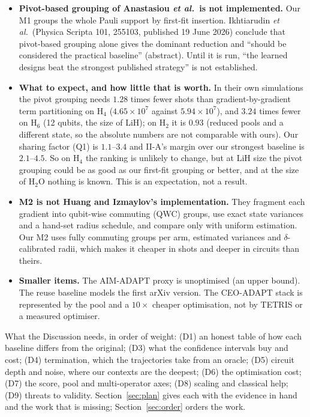 \documentclass[11pt]{article}
\newcommand{\Hfour}{H$_4$}
\newcommand{\Htwo}{H$_2$O}
\begin{document}
\begin{itemize}[leftmargin=1.6em,itemsep=2pt]
\item \textbf{Pivot-based grouping of Anastasiou \emph{et al.}\ is not implemented.} Our M1 groups the whole Pauli support by first-fit insertion. Ikhtiarudin \emph{et al.}\ (Physica Scripta 101, 255103, published 19 June 2026) conclude that pivot-based grouping alone gives the dominant reduction and ``should be considered the practical baseline'' (abstract). Until it is run, ``the learned designs beat the strongest published strategy'' is not established.
\item \textbf{What to expect, and how little that is worth.} In their own simulations the pivot grouping needs $1.28$ times fewer shots than gradient-by-gradient term partitioning on \Hfour{} ($4.65\times10^{7}$ against $5.94\times10^{7}$), and $3.24$ times fewer on H$_6$ (12 qubits, the size of LiH); on H$_2$ it is $0.93$ (reduced pools and a different state, so the absolute numbers are not comparable with ours). Our sharing factor (Q1) is $1.1$--$3.4$ and II-A's margin over our strongest baseline is $2.1$--$4.5$. So on \Hfour{} the ranking is unlikely to change, but at LiH size the pivot grouping could be as good as our first-fit grouping or better, and at the size of \Htwo{} nothing is known. This is an expectation, not a result.
\item \textbf{M2 is not Huang and Izmaylov's implementation.} They fragment each gradient into qubit-wise commuting (QWC) groups, use exact state variances and a hand-set radius schedule, and compare only with uniform estimation. Our M2 uses fully commuting groups per arm, estimated variances and $\delta$-calibrated radii, which makes it cheaper in shots and deeper in circuits than theirs.
\item \textbf{Smaller items.} The AIM-ADAPT proxy is unoptimised (an upper bound). The reuse baseline models the first arXiv version. The CEO-ADAPT stack is represented by the pool and a $10\times$ cheaper optimisation, not by TETRIS or a measured optimiser.
\end{itemize}

What the Discussion needs, in order of weight: (D1) an honest table of how each baseline differs from the original; (D3) what the confidence intervals buy and cost; (D4) termination, which the trajectories take from an oracle; (D5) circuit depth and noise, where our contexts are the deepest; (D6) the optimisation cost; (D7) the score, pool and multi-operator axes; (D8) scaling and classical help; (D9) threats to validity. Section~\ref{sec:plan} gives each with the evidence in hand and the work that is missing; Section~\ref{sec:order} orders the work.
\end{document}
